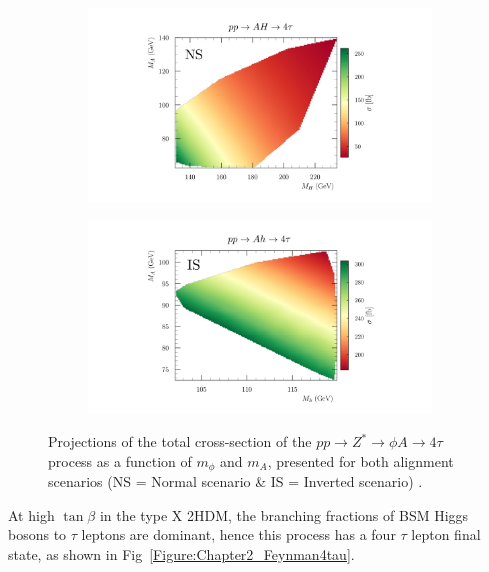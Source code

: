 \begin{figure}[h]
    \centering
    \begin{subfigure}[b]{0.8\textwidth}
        \centering
        \includegraphics[width=\textwidth]{Figures/Chapter2/4tau_ProductionXS_NS.png}
    \end{subfigure}
    \begin{subfigure}[b]{0.8\textwidth}
        \centering
        \includegraphics[width=\textwidth]{Figures/Chapter2/4tau_ProductionXS_IS.png}
    \end{subfigure}

    \caption{Projections of the total cross-section of the $pp \to Z^* \to \phi A \to 4\tau$ process as a function of $m_\phi$ and $m_A$, presented for both alignment scenarios (NS = Normal scenario \& IS = Inverted scenario) \cite{TypeX_2HDM}.}
    \label{Figure:Chapter2_4tau_ProductionXS}
\end{figure}

At high $\tan\beta$ in the type X 2HDM, the branching fractions of BSM Higgs bosons to $\tau$ leptons are dominant, hence this process has a four $\tau$ lepton final state, as shown in Fig~\ref{Figure:Chapter2_Feynman4tau}. 


